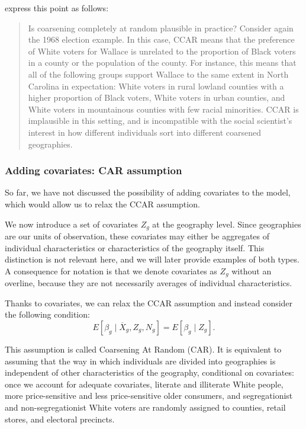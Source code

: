 \citet{kuriwaki2026roleconfounderslinearityecological} express this point as follows: 
\begin{quotation}
    Is coarsening completely at random plausible in practice? Consider again the 1968 election example.
    In this case, CCAR means that the preference of White voters for Wallace is unrelated to the proportion of Black voters in a county or the population of the county. For instance, this means that all of the following groups support Wallace to the same extent in North Carolina in expectation: White voters in rural lowland counties with a higher proportion of Black voters, White voters in urban counties, and White voters in mountainous counties with few racial minorities. CCAR is implausible in this setting, and is incompatible with the social scientist’s interest in how different individuals sort into different coarsened geographies.
\end{quotation}

\subsubsection{Adding covariates: CAR assumption}

So far, we have not discussed the possibility of adding covariates to the model, which would allow us to relax the CCAR assumption.

We now introduce a set of covariates $Z_g$ at the geography level. Since geographies are our units of observation, these covariates may either be aggregates of individual characteristics or characteristics of the geography itself. This distinction is not relevant here, and we will later provide examples of both types.
A consequence for notation is that we denote covariates as $Z_g$ without an overline, because they are not necessarily averages of individual characteristics.

Thanks to covariates, we can relax the CCAR assumption and instead consider the following condition:
\[
E[\beta_g \mid \overline{X}_g, Z_g, N_g] = E[\beta_g \mid Z_g].
\]

This assumption is called Coarsening At Random (CAR). It is equivalent to assuming that the way in which individuals are divided into geographies is independent of other characteristics of the geography, conditional on covariates: once we account for adequate covariates, literate and illiterate White people, more price-sensitive and less price-sensitive older consumers, and segregationist and non-segregationist White voters are randomly assigned to counties, retail stores, and electoral precincts.

